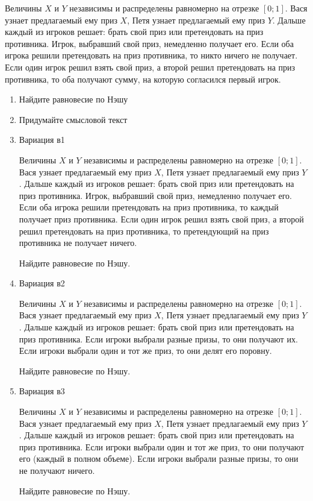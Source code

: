 \begin{problem}

Величины $X$ и $Y$ независимы и распределены равномерно на отрезке $[0;1]$. Вася узнает предлагаемый ему приз $X$, Петя узнает предлагаемый ему приз $Y$. Дальше каждый из игроков решает: брать  свой приз или претендовать на приз противника. Игрок, выбравший свой приз, немедленно получает его. Если оба игрока решили претендовать на приз противника, то никто ничего не получает. Если один игрок решил взять свой приз, а второй решил претендовать на приз противника, то оба получают сумму, на которую согласился первый игрок. \par
\begin{enumerate}
\item Найдите равновесие по Нэшу \par
\item Придумайте смысловой текст \par
\item  Вариация в1 \par
Величины $X$ и $Y$ независимы и распределены равномерно на отрезке $[0;1]$. Вася узнает предлагаемый ему приз $X$, Петя узнает предлагаемый ему приз $Y$. Дальше каждый из игроков решает: брать  свой приз или претендовать на приз противника. Игрок, выбравший свой приз, немедленно получает его. Если оба игрока решили претендовать на приз противника, то каждый получает приз противника. Если один игрок решил взять свой приз, а второй решил претендовать на приз противника, то претендующий на приз противника не получает ничего. \par
Найдите равновесие по Нэшу.\par
\item  Вариация в2 \par
Величины $X$ и $Y$ независимы и распределены равномерно на отрезке $[0;1]$. Вася узнает предлагаемый ему приз $X$, Петя узнает предлагаемый ему приз $Y$. Дальше каждый из игроков решает: брать  свой приз или претендовать на приз противника. Если игроки выбрали разные призы, то они получают их. Если игроки выбрали один и тот же приз, то они делят его поровну.\par
Найдите равновесие по Нэшу.\par
\item  Вариация в3 \par
Величины $X$ и $Y$ независимы и распределены равномерно на отрезке $[0;1]$. Вася узнает предлагаемый ему приз $X$, Петя узнает предлагаемый ему приз $Y$. Дальше каждый из игроков решает: брать  свой приз или претендовать на приз противника. Если игроки выбрали один и тот же приз, то они получают его (каждый в полном объеме). Если игроки выбрали разные призы, то они не получают ничего.\par
Найдите равновесие по Нэшу.
\end{enumerate}


\begin{sol}

\end{sol}
\end{problem}



